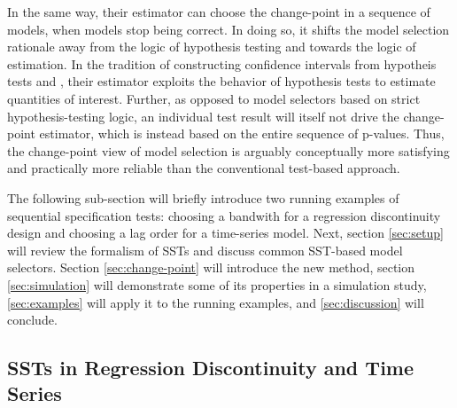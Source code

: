 \documentclass[12pt]{article}\usepackage[]{graphicx}\usepackage[]{color}
\begin{document}
In the same way, their estimator can choose the change-point in
a sequence of models, when models stop being correct.
In doing so, it shifts the model selection rationale away
from the logic of hypothesis testing and towards the logic of
estimation.
In the tradition of constructing confidence intervals from hypotheis
tests and \citet{hodgesLehmann}, their estimator exploits
the behavior of hypothesis tests to estimate quantities of interest.
Further, as opposed to model selectors based on strict
hypothesis-testing logic, an individual test result will itself not
drive the change-point estimator, which is instead based on the entire
sequence of p-values.
Thus, the change-point view of model selection is arguably conceptually
more satisfying and practically more reliable than the conventional
test-based approach.

The following sub-section will briefly introduce two running examples
of sequential specification tests: choosing a bandwith for a
regression discontinuity design and choosing a lag order for a
time-series model.
Next, section \ref{sec:setup} will review the formalism of SSTs and
discuss common SST-based model selectors.
Section \ref{sec:change-point} will introduce the new method, section
\ref{sec:simulation} will demonstrate some of its properties in a
simulation study, \ref{sec:examples} will apply it to the running
examples, and \ref{sec:discussion} will conclude.

\subsection{SSTs in Regression Discontinuity and Time Series}
\end{document}
